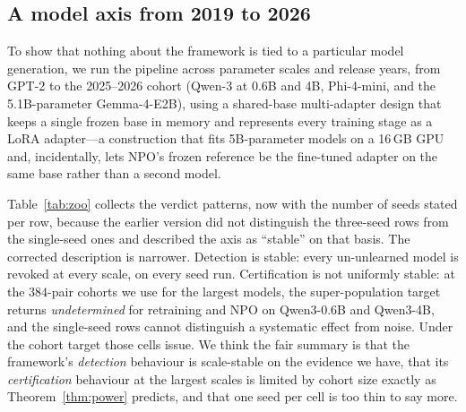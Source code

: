 \begin{table}[t]
\centering\small
\caption{Canary detectability on TOFU under GPT-2 as the pristine base model
($3{,}000$ organic records, $384$ canaries, one seed --- this is a single
configuration, not a sweep). ``recall'' is at a $1\%$ false-positive
rate on organic data. The predicted excess is $H\ln 2/T$; the observed excess exceeds
it because the template's own phrasing is also off-distribution. Bold marks the one
configuration a zero-knowledge filter substantially fails to recover.}
\label{tab:detect}

\end{table}

\subsection{A model axis from 2019 to 2026}\label{sec:exp-zoo}

To show that nothing about the framework is tied to a particular model generation, we
run the pipeline across parameter scales and release years, from GPT-2 to the
2025--2026 cohort (Qwen-3 at 0.6B and 4B, Phi-4-mini, and the 5.1B-parameter
Gemma-4-E2B), using a shared-base multi-adapter design that keeps a single frozen base
in memory and represents every training stage as a LoRA adapter---a construction that
fits 5B-parameter models on a 16\,GB GPU and, incidentally, lets
NPO's frozen reference be the fine-tuned adapter on the same base rather than a second
model.

Table~\ref{tab:zoo} collects the verdict patterns, now with the number of seeds stated
per row, because the earlier version did not distinguish the three-seed rows from the
single-seed ones and described the axis as ``stable'' on that basis. The corrected
description is narrower. Detection is stable: every un-unlearned model is revoked at
every scale, on every seed run. Certification is not uniformly stable: at the $384$-pair
cohorts we use for the largest models, the super-population target returns
\emph{undetermined} for retraining and NPO on Qwen3-0.6B and Qwen3-4B, and the
single-seed rows cannot distinguish a systematic effect from noise. Under the cohort
target those cells issue. We think the fair summary is that the framework's
\emph{detection} behaviour is scale-stable on the evidence we have, that its
\emph{certification} behaviour at the largest scales is limited by cohort size exactly
as Theorem~\ref{thm:power} predicts, and that one seed per cell is too thin to say more.

\begin{table}[t]
\centering\small
\caption{Model axis, verdicts per seed for the core subjects at $\eps = 0.2$ on the
cohort target, spanning 0.9M to 5.1B parameters and release years 2019 to 2026. The
seeds column states how many runs each cell aggregates; the $4$ largest models have
$1$ seed each.}
\label{tab:zoo}

\end{table}

